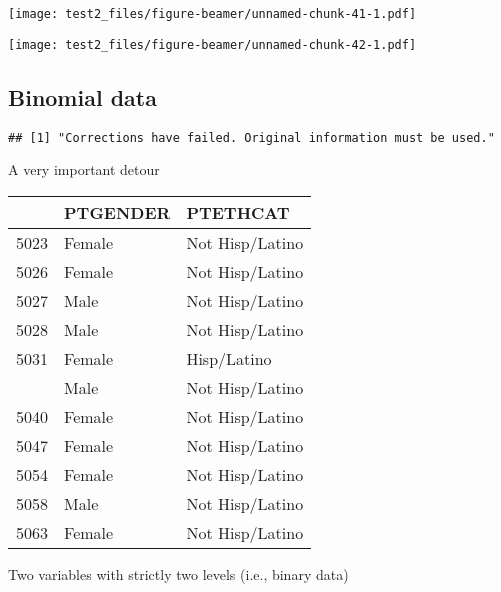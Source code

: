 \documentclass[
  ignorenonframetext,
]{beamer}
\begin{document}
\begin{frame}

\texttt{[image: test2\_files/figure-beamer/unnamed-chunk-41-1.pdf]}

\end{frame}

\begin{frame}

\texttt{[image: test2\_files/figure-beamer/unnamed-chunk-42-1.pdf]}

\end{frame}

\hypertarget{binomial-data}{%
\subsection{Binomial data}\label{binomial-data}}

\begin{verbatim}
## [1] "Corrections have failed. Original information must be used."
\end{verbatim}

\begin{frame}{A very important detour}
\protect\hypertarget{a-very-important-detour}{}

\begin{table}[H]
\centering\begingroup\fontsize{7}{9}\selectfont

\begin{tabular}{lll}
\toprule
  & PTGENDER & PTETHCAT\\
\midrule
5023 & Female & Not Hisp/Latino\\
5026 & Female & Not Hisp/Latino\\
5027 & Male & Not Hisp/Latino\\
5028 & Male & Not Hisp/Latino\\
5031 & Female & Hisp/Latino\\
\addlinespace
5037 & Male & Not Hisp/Latino\\
5040 & Female & Not Hisp/Latino\\
5047 & Female & Not Hisp/Latino\\
5054 & Female & Not Hisp/Latino\\
5058 & Male & Not Hisp/Latino\\
5063 & Female & Not Hisp/Latino\\
\bottomrule
\end{tabular}\endgroup{}
\end{table}

\begin{center}Two variables with strictly two levels (i.e., binary data)\end{center}

\end{frame}
\end{document}
